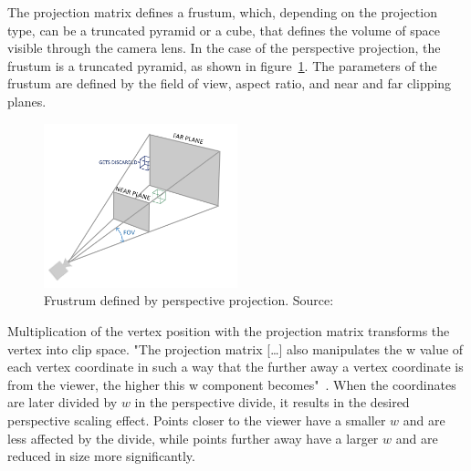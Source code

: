 
The projection matrix defines a frustum, which, depending on the projection type, can be a truncated pyramid or a cube,
that defines the volume of space visible through the camera lens.
In the case of the perspective projection, the frustum is a truncated pyramid, as shown in figure~\ref{fig:perspective}.
The parameters of the frustum are defined by the field of view, aspect ratio, and near and far clipping planes.
\begin{figure}[h!]
    \centering
    \includegraphics[width=0.50\textwidth]{images/perspective}
    \caption{Frustrum defined by perspective projection. Source: \cite{de_vries_learn_2020}}
    \label{fig:perspective}
\end{figure}
Multiplication of the vertex position with the projection matrix transforms the vertex into clip space.
"The projection matrix [\ldots] also manipulates the w value of each vertex coordinate in such a way
that the further away a vertex coordinate is from the viewer, the higher this w component becomes"~\parencite{de_vries_learn_2020}.
When the coordinates are later divided by $w$ in the perspective divide,
it results in the desired perspective scaling effect.
Points closer to the viewer have a smaller $w$ and are less affected by the divide,
while points further away have a larger $w$ and are reduced in size more significantly.


